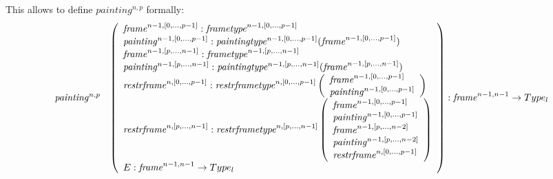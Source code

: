 \documentclass{article}
\newcommand{\myframe}{\mathit{frame}}
\newcommand{\myframetype}{\mathit{frametype}}
\newcommand{\painting}{\mathit{painting}}
\newcommand{\paintingtype}{\mathit{paintingtype}}
\newcommand{\restrframe}{\mathit{restrframe}}
\newcommand{\restrframetype}{\mathit{restrframetype}}
\begin{document}
\begin{itemize}
        This allows to define $\painting^{n,p}$ formally:
        $$
          \begin{array}{llcl}
            \painting^{n,p}                                     &
            \multicolumn{3}{l}{
              \left(\begin{array}{l}
                        \myframe^{n-1,[0,...,p-1]}:\myframetype^{n-1,[0,...,p-1]}                               \\
                        \painting^{n-1,[0,...,p-1]}:\paintingtype^{n-1,[0,...,p-1]}(\myframe^{n-1,[0,...,p-1]}) \\
                        \myframe^{n-1,[p,...,n-1]}:\myframetype^{n-1,[p,...,n-1]}                                     \\
                        \painting^{n-1,[p,...,n-1]}:\paintingtype^{n-1,[p,...,n-1]}(\myframe^{n-1,[p,...,n-1]})           \\
                        \restrframe^{n,[0,...,p-1]}:\restrframetype^{n,[0,...,p-1]}
                                \left(\begin{array}{l}
                                    \myframe^{n-1,[0,...,p-1]}  \\
                                    \painting^{n-1,[0,...,p-1]} \\
                                  \end{array}\right) \\
                        \restrframe^{n,[p,...,n-1]}:\restrframetype^{n,[p,...,n-1]}
                                \left(\begin{array}{l}
                                    \myframe^{n-1,[0,...,p-1]}  \\
                                    \painting^{n-1,[0,...,p-1]} \\
                                    \myframe^{n-1,[p,...,n-2]}  \\
                                    \painting^{n-1,[p,...,n-2]} \\
                                    \restrframe^{n,[0,...,p-1]} \\
                                  \end{array}\right) \\
                        E:\myframe^{n-1,n-1}\rightarrow Type_l\\
                      \end{array}\right) : \myframe^{n-1,n-1}\rightarrow Type_l
            }    \\

\end{array}$$
\end{itemize}
\end{document}
